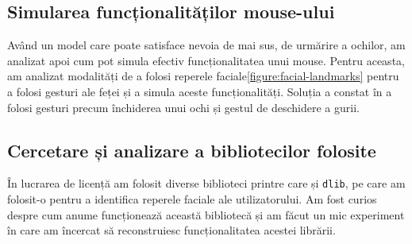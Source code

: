 \subsection{Simularea funcționalităților mouse-ului}
Având un model care poate satisface nevoia de mai sus, de urmărire a ochilor, am analizat apoi cum pot simula efectiv funcționalitatea unui mouse.
Pentru aceasta, am analizat modalități de a folosi reperele faciale\ref{figure:facial-landmarks} pentru a folosi gesturi ale feței și a simula aceste funcționalități.
Soluția a constat în a folosi gesturi precum închiderea unui ochi și gestul de deschidere a gurii.

\subsection{Cercetare și analizare a bibliotecilor folosite}
În lucrarea de licență am folosit diverse biblioteci printre care și \lstinline{dlib}, pe care am folosit-o pentru a identifica reperele faciale ale utilizatorului.
Am fost curios despre cum anume funcționează această bibliotecă și am făcut un mic experiment în care am încercat să reconstruiesc funcționalitatea acestei librării.